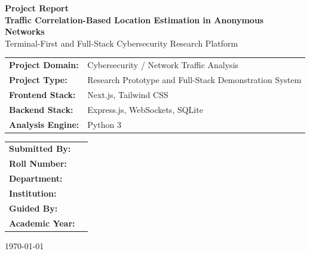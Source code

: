 \documentclass[12pt,a4paper]{report}
\begin{document}
\begin{titlepage}
    \centering
    \vspace*{1.5cm}
    {\Large \textbf{Project Report}}\\[1.2cm]
    {\Huge \textbf{Traffic Correlation-Based Location Estimation in Anonymous Networks}}\\[1.2cm]
    {\Large Terminal-First and Full-Stack Cybersecurity Research Platform}\\[1.8cm]

    \begin{tabular}{>{\bfseries}p{5cm}p{8cm}}
        Project Domain: & Cybersecurity / Network Traffic Analysis \\
        Project Type: & Research Prototype and Full-Stack Demonstration System \\
        Frontend Stack: & Next.js, Tailwind CSS \\
        Backend Stack: & Express.js, WebSockets, SQLite \\
        Analysis Engine: & Python 3 \\
    \end{tabular}

    \vfill

    \begin{tabular}{>{\bfseries}p{5cm}p{8cm}}
        Submitted By: & \underline{\hspace{7cm}} \\
        Roll Number: & \underline{\hspace{7cm}} \\
        Department: & \underline{\hspace{7cm}} \\
        Institution: & \underline{\hspace{7cm}} \\
        Guided By: & \underline{\hspace{7cm}} \\
        Academic Year: & \underline{\hspace{7cm}} \\
    \end{tabular}

    \vfill
    {\large \today}
\end{titlepage}

\end{document}
